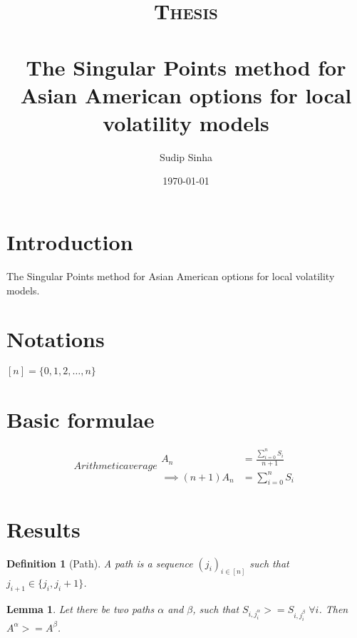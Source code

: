 \documentclass[a4paper]{article}
\title{	
\normalfont \normalsize 
\textsc{Thesis} \\ [25pt]
\horrule{0.5pt} \\[0.4cm] %
\huge The Singular Points method for Asian American options for local volatility models %
\horrule{2pt} \\[0.5cm] %
}
\author{Sudip Sinha}
\date{\normalsize\today}
\numberwithin{equation}{section} %
\numberwithin{figure}{section} %
\numberwithin{table}{section} %
\newtheorem{lem}{Lemma}
\newtheorem{defn}{Definition}
\begin{document}
\maketitle  %




\section{Introduction}
The Singular Points method for Asian American options for local volatility models.


\section{Notations}
$[n] = \{0, 1, 2, \dots, n\}$


\section{Basic formulae}

\begin{subequations} \label{eq:arithmeticmean}
Arithmetic average
\begin{align}
A_{n} &= \frac{\sum_{i=0}^n S_i}{n+1} \\
\implies (n+1) A_{n} &= \sum_{i=0}^n S_i
\end{align}
\end{subequations}


\section{Results}

\begin{defn}[Path]
A path is a sequence $(j_i)_{i \in [n]}$ such that $j_{i+1} \in \{ j_i,j_i+1 \}$.
\end{defn}


\begin{lem}
Let there be two paths $\alpha$ and $\beta$, such that $S_{i,j_i^\alpha} >= S_{i,j_i^\beta} \; \forall i$. Then $A^\alpha >= A^\beta$.
\end{lem}
\end{document}
